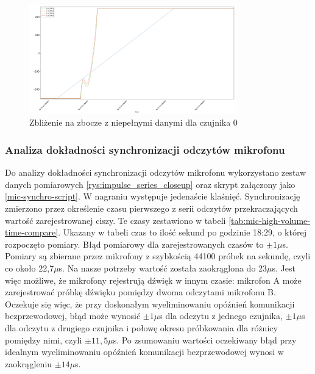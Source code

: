 \documentclass[12pt,oneside,a4paper]{book}
\theoremstyle{break}
\begin{document}
\begin{figure}[H]
    \begin{center}
        \includegraphics[width=0.8\textwidth]{broken_edge_closeup.png}
        \caption{Zbliżenie na zbocze z niepełnymi danymi dla czujnika 0}
        \label{rys:broken_edge_closeup}
    \end{center}
\end{figure}

\subsubsection{Analiza dokładności synchronizacji odczytów mikrofonu}
Do analizy dokładności synchronizacji odczytów mikrofonu
wykorzystano zestaw danych pomiarowych \ref{rys:impulse_series_closeup}
oraz skrypt załączony jako \ref*{mic-synchro-script}.
W nagraniu występuje jedenaście klaśnięć. Synchronizację zmierzono przez 
określenie czasu pierwszego z serii odczytów przekraczających 
wartość zarejestrowanej ciszy. 
Te czasy zestawiono w tabeli \ref*{tab:mic-high-volume-time-compare}.
Ukazany w tabeli czas to ilość sekund po godzinie 18:29, o której 
rozpoczęto
pomiary.
Błąd pomiarowy dla zarejestrowanych czasów to $\pm1\mu$s. 
Pomiary są zbierane przez mikrofony z szybkością 44100 próbek 
na sekundę, czyli
co około 22,7$\mu$s. Na nasze potrzeby wartość została zaokrąglona
do 23$\mu$s. Jest więc możliwe, że mikrofony rejestrują dźwięk 
w innym czasie: mikrofon A może zarejestrować próbkę dźwięku
pomiędzy dwoma odczytami mikrofonu B.
Oczekuje się więc, że przy doskonałym wyeliminowaniu 
opóźnień komunikacji bezprzewodowej, błąd może wynosić $\pm1\mu$s dla 
odczytu z jednego czujnika, $\pm1\mu$s dla odczytu z drugiego czujnika i
połowę okresu próbkowania dla różnicy pomiędzy nimi, czyli $\pm11,5\mu$s.
Po zsumowaniu wartości oczekiwany błąd przy idealnym wyeliminowaniu 
opóźnień komunikacji bezprzewodowej
wynosi w zaokrągleniu $\pm14\mu$s.
\end{document}
